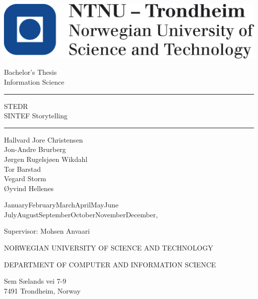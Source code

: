 
\begin{titlepage}
  \begin{center}
    \includegraphics[scale=0.5]{res/logo_ntnu_eng.png}
    
    \vspace{1cm}
    
    {\large Bachelor's Thesis}\\[1mm]
    {\large Information Science}
    
    \vspace{1cm}

    \rule{0.5\textwidth}{0.4pt}\par
    
    {\huge STEDR\\[1ex]
     SINTEF Storytelling}
    
    \rule{0.5\textwidth}{0.4pt}\par
    
    \vspace{1cm}
    
    {\large Hallvard Jore Christensen}\\
    {\large Jon-Andre Brurberg}\\
    {\large Jørgen Rugelsjøen Wikdahl}\\
    {\large Tor Barstad}\\
    {\large Vegard Storm}\\
    {\large Øyvind Hellenes}\\
    
    \vspace{\fill}
    
    {\large
      \ifcase\month\or
      January\or February\or March\or April\or May\or June\or
      July\or August\or September\or October\or November\or December\fi,
      \number\year
    }
    
    \vspace{\fill}
    
    Supervisor: Mohsen Anvaari
    
    \vspace{0.3cm}
    
    \vspace{\fill}
    
    NORWEGIAN UNIVERSITY OF SCIENCE AND TECHNOLOGY
    
    DEPARTMENT OF COMPUTER AND INFORMATION SCIENCE
    
    \vspace{.5cm}
    
   Sem Sælands vei 7-9\\
   
   7491 Trondheim, Norway
    
  \end{center}
\end{titlepage}

